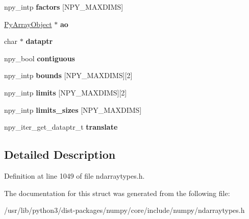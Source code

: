 \begin{DoxyCompactItemize}
\item 
npy\+\_\+intp {\bfseries factors} \mbox{[}N\+P\+Y\+\_\+\+M\+A\+X\+D\+I\+MS\mbox{]}\hypertarget{structPyArrayIterObject__tag_abcc6dec21367120c445d49f268aca84d}{}\label{structPyArrayIterObject__tag_abcc6dec21367120c445d49f268aca84d}

\item 
\hyperlink{structtagPyArrayObject__fields}{Py\+Array\+Object} $\ast$ {\bfseries ao}\hypertarget{structPyArrayIterObject__tag_a5ede98d0a1aa9c3c99841594b0ae9dbc}{}\label{structPyArrayIterObject__tag_a5ede98d0a1aa9c3c99841594b0ae9dbc}

\item 
char $\ast$ {\bfseries dataptr}\hypertarget{structPyArrayIterObject__tag_a32f07c2dfd72cc3a9ef64e696077d1dd}{}\label{structPyArrayIterObject__tag_a32f07c2dfd72cc3a9ef64e696077d1dd}

\item 
npy\+\_\+bool {\bfseries contiguous}\hypertarget{structPyArrayIterObject__tag_a179df0bf4ab194a39c2ac54b0448c47f}{}\label{structPyArrayIterObject__tag_a179df0bf4ab194a39c2ac54b0448c47f}

\item 
npy\+\_\+intp {\bfseries bounds} \mbox{[}N\+P\+Y\+\_\+\+M\+A\+X\+D\+I\+MS\mbox{]}\mbox{[}2\mbox{]}\hypertarget{structPyArrayIterObject__tag_a5fb5f3f1223462ee3a9a9d18b4fd86fc}{}\label{structPyArrayIterObject__tag_a5fb5f3f1223462ee3a9a9d18b4fd86fc}

\item 
npy\+\_\+intp {\bfseries limits} \mbox{[}N\+P\+Y\+\_\+\+M\+A\+X\+D\+I\+MS\mbox{]}\mbox{[}2\mbox{]}\hypertarget{structPyArrayIterObject__tag_a1f7045d9a46a41c211be6215f05599e9}{}\label{structPyArrayIterObject__tag_a1f7045d9a46a41c211be6215f05599e9}

\item 
npy\+\_\+intp {\bfseries limits\+\_\+sizes} \mbox{[}N\+P\+Y\+\_\+\+M\+A\+X\+D\+I\+MS\mbox{]}\hypertarget{structPyArrayIterObject__tag_aae770470492747be52a454cfd4c373fb}{}\label{structPyArrayIterObject__tag_aae770470492747be52a454cfd4c373fb}

\item 
npy\+\_\+iter\+\_\+get\+\_\+dataptr\+\_\+t {\bfseries translate}\hypertarget{structPyArrayIterObject__tag_a3b7bd1e1c71e7eef2513b65770cf9aa3}{}\label{structPyArrayIterObject__tag_a3b7bd1e1c71e7eef2513b65770cf9aa3}

\end{DoxyCompactItemize}


\subsection{Detailed Description}


Definition at line 1049 of file ndarraytypes.\+h.



The documentation for this struct was generated from the following file\+:\begin{DoxyCompactItemize}
\item 
/usr/lib/python3/dist-\/packages/numpy/core/include/numpy/ndarraytypes.\+h\end{DoxyCompactItemize}
